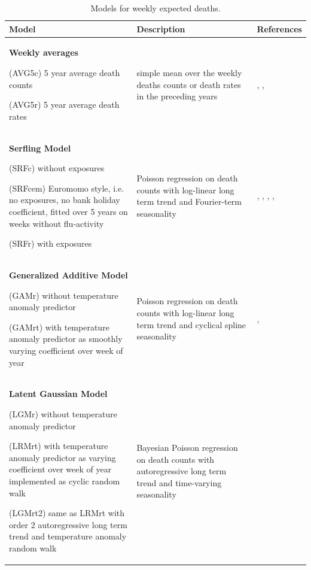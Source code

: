 \documentclass[12pt]{article}
\begin{document}
\begin{table}[H]
\small
\caption{Models for weekly expected deaths.}
\label{tab:models}
\begin{tabularx}{\textwidth} {
  >{\raggedright\arraybackslash}X
  >{\raggedright\arraybackslash}X
  >{\raggedright\arraybackslash}X }
\toprule
\textbf{Model} & \textbf{Description} & \textbf{References} \\ \midrule
\textbf{Weekly averages}\par
(AVG5c) 5 year average death counts\par
(AVG5r) 5 year average death rates
 &
 simple mean over the weekly deaths counts or death rates in the preceding years
 &
\cite{Modig2020}, \cite{Stang2020}, \cite{Campbell2021}\\ \midrule
\textbf{Serfling Model}\par
(SRFc) without exposures\par
(SRFcem) Euromomo style, i.e. no exposures, no bank holiday coefficient, fitted over 5 years on weeks without flu-activity\par
(SRFr) with exposures
&
Poisson regression on death counts with log-linear long term trend and Fourier-term seasonality
&
\cite{Barnard2020}, \cite{Weinberger2020}, \cite{Woolf2020}, \cite{EuroMoMo2020}, \cite{Arolas2021}
\\ \midrule
\textbf{Generalized Additive Model}\par
(GAMr) without temperature anomaly predictor\par
(GAMrt) with temperature anomaly predictor as smoothly varying coefficient over week of year
&
Poisson regression on death counts with log-linear long term trend and cyclical spline seasonality
&
\cite{Aburto2021}, \cite{Scortichini2020}
\\ \midrule
\textbf{Latent Gaussian Model}\par
(LGMr) without temperature anomaly predictor\par
(LRMrt) with temperature anomaly predictor as varying coefficient over week of year implemented as cyclic random walk\par
(LGMrt2) same as LRMrt with order 2 autoregressive long term trend and temperature anomaly random walk
&
Bayesian Poisson regression on death counts with autoregressive long term trend and time-varying seasonality
&
\cite{Kontis2020}
\\ \bottomrule
\end{tabularx}
\end{table}
\end{document}
